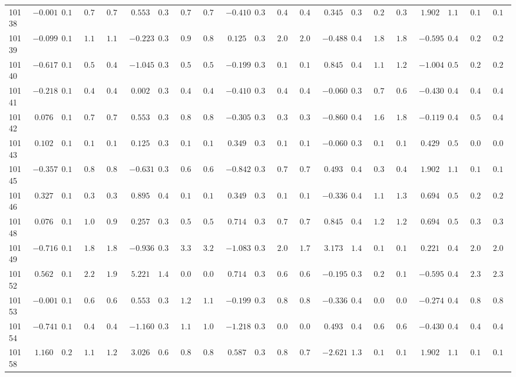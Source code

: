 \begin{landscape}
{\begin{longtable}{l|rrrr|rrrr|rrrr|rrrr|rrrr}
10138&$-0.001$&$0.159$&$0.790$&$0.756$&$ 0.553$&$0.395$&$0.711$&$0.716$&$-0.410$&$0.330$&$0.489$&$0.492$&$ 0.345$&$0.396$&$0.297$&$0.304$&$ 1.902$&$1.193$&$0.177$&$0.179$\tabularnewline
10139&$-0.099$&$0.157$&$1.163$&$1.175$&$-0.223$&$0.334$&$0.920$&$0.888$&$ 0.125$&$0.336$&$2.016$&$2.018$&$-0.488$&$0.420$&$1.866$&$1.854$&$-0.595$&$0.444$&$0.269$&$0.266$\tabularnewline
10140&$-0.617$&$0.157$&$0.514$&$0.490$&$-1.045$&$0.346$&$0.503$&$0.513$&$-0.199$&$0.330$&$0.115$&$0.115$&$ 0.845$&$0.472$&$1.194$&$1.258$&$-1.004$&$0.524$&$0.275$&$0.277$\tabularnewline
10141&$-0.218$&$0.154$&$0.484$&$0.470$&$ 0.002$&$0.349$&$0.430$&$0.449$&$-0.410$&$0.330$&$0.483$&$0.485$&$-0.060$&$0.384$&$0.718$&$0.632$&$-0.430$&$0.428$&$0.455$&$0.450$\tabularnewline
10142&$ 0.076$&$0.162$&$0.798$&$0.791$&$ 0.553$&$0.395$&$0.872$&$0.821$&$-0.305$&$0.330$&$0.364$&$0.365$&$-0.860$&$0.496$&$1.680$&$1.816$&$-0.119$&$0.426$&$0.500$&$0.494$\tabularnewline
10143&$ 0.102$&$0.163$&$0.125$&$0.127$&$ 0.125$&$0.358$&$0.118$&$0.119$&$ 0.349$&$0.345$&$0.140$&$0.137$&$-0.060$&$0.384$&$0.136$&$0.149$&$ 0.429$&$0.504$&$0.028$&$0.029$\tabularnewline
10145&$-0.357$&$0.154$&$0.864$&$0.851$&$-0.631$&$0.324$&$0.606$&$0.600$&$-0.842$&$0.347$&$0.785$&$0.731$&$ 0.493$&$0.411$&$0.398$&$0.413$&$ 1.902$&$1.193$&$0.177$&$0.179$\tabularnewline
10146&$ 0.327$&$0.176$&$0.384$&$0.356$&$ 0.895$&$0.420$&$0.102$&$0.108$&$ 0.349$&$0.345$&$0.135$&$0.136$&$-0.336$&$0.401$&$1.140$&$1.388$&$ 0.694$&$0.577$&$0.282$&$0.288$\tabularnewline
10148&$ 0.076$&$0.162$&$1.010$&$0.904$&$ 0.257$&$0.370$&$0.588$&$0.542$&$ 0.714$&$0.373$&$0.766$&$0.739$&$ 0.845$&$0.472$&$1.200$&$1.263$&$ 0.694$&$0.577$&$0.301$&$0.323$\tabularnewline
10149&$-0.716$&$0.161$&$1.830$&$1.804$&$-0.936$&$0.337$&$3.322$&$3.288$&$-1.083$&$0.371$&$2.091$&$1.735$&$ 3.173$&$1.487$&$0.122$&$0.133$&$ 0.221$&$0.462$&$2.008$&$2.064$\tabularnewline
10152&$ 0.562$&$0.194$&$2.241$&$1.987$&$ 5.221$&$1.494$&$0.080$&$0.089$&$ 0.714$&$0.373$&$0.625$&$0.606$&$-0.195$&$0.390$&$0.201$&$0.184$&$-0.595$&$0.444$&$2.314$&$2.363$\tabularnewline
10153&$-0.001$&$0.159$&$0.675$&$0.682$&$ 0.553$&$0.395$&$1.292$&$1.194$&$-0.199$&$0.330$&$0.880$&$0.877$&$-0.336$&$0.401$&$0.073$&$0.082$&$-0.274$&$0.422$&$0.853$&$0.854$\tabularnewline
10154&$-0.741$&$0.162$&$0.489$&$0.499$&$-1.160$&$0.358$&$1.153$&$1.092$&$-1.218$&$0.391$&$0.078$&$0.091$&$ 0.493$&$0.411$&$0.679$&$0.655$&$-0.430$&$0.428$&$0.455$&$0.450$\tabularnewline
10158&$ 1.160$&$0.269$&$1.112$&$1.220$&$ 3.026$&$0.623$&$0.865$&$0.850$&$ 0.587$&$0.361$&$0.827$&$0.784$&$-2.621$&$1.373$&$0.129$&$0.145$&$ 1.902$&$1.193$&$0.177$&$0.179$\tabularnewline
\hline
\end{longtable}}\end{landscape}

